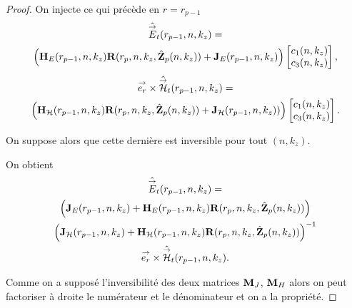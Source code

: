 \begin{proof}
      On injecte ce qui précède en \(r = r_{p-1}\)
      \begin{multline*}
        \hat{{\overset{\rightarrow}{E}}}_t(r_{p-1},n,k_z) = 
        \\
        \left(\mathbf{H}_{E}(r_{p-1},n,k_z)\mathbf{R}(r_{p},n,k_z,\hat{\mathbf{Z}}_p(n,k_z)) + \mathbf{J}_{E}(r_{p-1},n,k_z)\right)
        \begin{bmatrix}
          c_1(n,k_z) \\
          c_3(n,k_z)
        \end{bmatrix},
      \end{multline*}        
      \begin{multline*}
        {\overset{\rightarrow}{e_r}}\times\hat{{\overset{\rightarrow}{\mathcal{H}}}}_t(r_{p-1},n,k_z) =
        \\
        \left(\mathbf{H}_{\mathcal{H}}(r_{p-1},n,k_z)\mathbf{R}(r_{p},n,k_z,\hat{\mathbf{Z}}_p(n,k_z)) + \mathbf{J}_{\mathcal{H}}(r_{p-1},n,k_z))\right)
        \begin{bmatrix}
          c_1(n,k_z) \\
          c_3(n,k_z)
        \end{bmatrix}.
      \end{multline*}

      On suppose alors que cette dernière est inversible pour tout \((n,k_z)\).

      On obtient
      \begin{multline*}
        \hat{{\overset{\rightarrow}{E}}}_t(r_{p-1},n,k_z) =
        \\
        \left(\mathbf{J}_{E}(r_{p-1},n,k_z) + \mathbf{H}_{E}(r_{p-1},n,k_z)\mathbf{R}(r_{p},n,k_z,\hat{\mathbf{Z}}_p(n,k_z))\right) \\
        \left(\mathbf{J}_{\mathcal{H}}(r_{p-1},n,k_z) + \mathbf{H}_{\mathcal{H}}(r_{p-1},n,k_z)\mathbf{R}(r_{p},n,k_z,\hat{\mathbf{Z}}_p(n,k_z))\right)^{-1}
        \\
        {\overset{\rightarrow}{e_r}}\times\hat{{\overset{\rightarrow}{\mathcal{H}}}}_t(r_{p-1},n,k_z).
      \end{multline*}

      Comme on a supposé l'inversibilité des deux matrices \(\mathbf{M}_J\), \(\mathbf{M}_H\) alors on peut factoriser à droite le numérateur et le dénominateur et on a la propriété.
    \end{proof}

